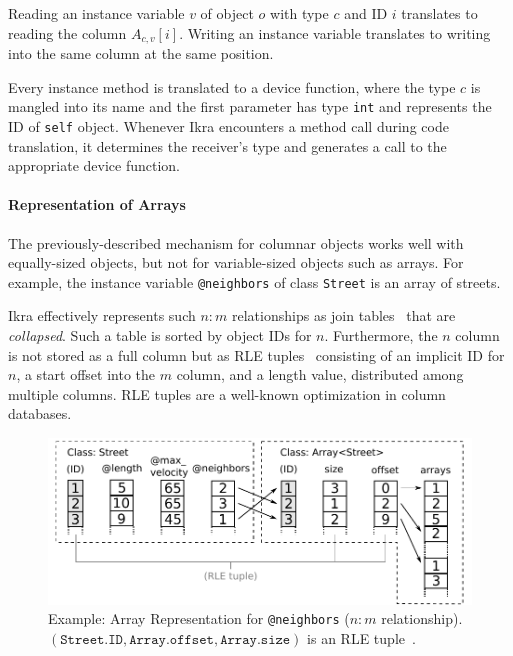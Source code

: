 \documentclass[preprint]{sigplanconf}
\begin{document}
Reading an instance variable $v$ of object $o$ with type $c$ and ID $i$ translates to reading the column $A_{c,v}[i]$. Writing an instance variable translates to writing into the same column at the same position.

Every instance method is translated to a device function, where the type $c$ is mangled into its name and the first parameter has type \texttt{int} and represents the ID of \texttt{self} object. Whenever Ikra encounters a method call during code translation, it determines the receiver's type and generates a call to the appropriate device function.

\paragraph{Representation of Arrays}
The previously-described mechanism for columnar objects works well with equally-sized objects, but not for variable-sized objects such as arrays. For example, the instance variable \texttt{@neighbors} of class \texttt{Street} is an array of streets.

Ikra effectively represents such $n:m$ relationships as join tables~\cite{Garcia-Molina:2008:DSC:1450931} that are \emph{collapsed}. Such a table is sorted by object IDs for $n$. Furthermore, the $n$ column is not stored as a full column but as RLE tuples~\cite{Abadi:2006:ICE:1142473.1142548} consisting of an implicit ID for $n$, a start offset into the $m$ column, and a length value, distributed among multiple columns. RLE tuples are a well-known optimization in column databases.

\begin{figure}[!htp]
    \centering
    \includegraphics[width=\columnwidth]{column_access.pdf}
    \caption{Example: Array Representation for \texttt{@neighbors} ($n:m$ relationship). $(\texttt{Street.ID}, \texttt{Array.offset}, \texttt{Array.size})$ is an RLE tuple~\cite{Abadi:2006:ICE:1142473.1142548}.}
    \label{fig:array_repr}
\end{figure}
\end{document}
